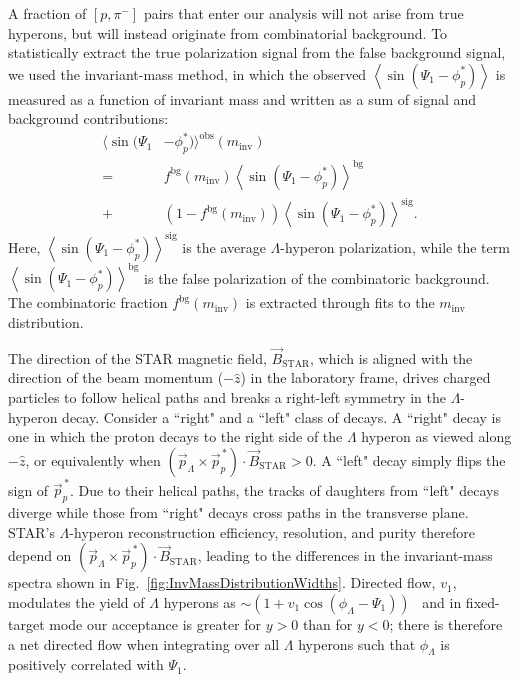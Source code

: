 \documentclass[
  reprint,
  superscriptaddress,
  amsmath,
  amssymb,
  aps,
  floatfix,
]{revtex4-2}
\newcommand{\proton}{p}
\newcommand{\pion}{\pi^{-}}
\newcommand{\InvMass}{m_\mathrm{inv}}
\newcommand{\pstar}{_\proton^{*}}
\newcommand{\PpStar}{\vec{p}_\proton^{\,*}} %
\newcommand{\PsiEP}{\Psi_{1}}
\newcommand{\sig}{^\mathrm{sig}}
\newcommand{\bg}{^\mathrm{bg}}
\newcommand{\obs}{^\mathrm{obs}}
\newcommand{\BSTAR}{\vec{B}_\mathrm{STAR}}
\newcommand{\PolarizationCorrelationTerm}{\left<\sin(\PsiEP-\phi\pstar)\right>}
\newcommand{\RightLeftTripleProduct}{\left(\vec{p}_\Lambda\times\PpStar\right)\cdot\BSTAR}
\begin{document}
A fraction of $[\proton,\pion]$ pairs that
 enter our analysis will not arise
 from true hyperons, but will instead
 originate from combinatorial background. To statistically
 extract the true polarization signal from
 the false background signal, we used
 the invariant-mass method\cite{Adam:2018ivw,Adamczyk:2013gw,Borghini:2004ra}, in which the
 observed $\left\langle\sin\left(\PsiEP-\phi\pstar\right)\right\rangle$ is measured as a
 function of invariant mass and written
 as a sum of signal and
 background contributions:
\begin{align}
\label{eq:InvMassMethod}
  \langle\sin(\PsiEP&-\phi\pstar)\rangle\obs\left(\InvMass\right)\\
  =&f\bg\left(\InvMass\right)\PolarizationCorrelationTerm\bg \nonumber \\
  +&\left(1-f\bg\left(\InvMass\right)\right)\PolarizationCorrelationTerm\sig. \nonumber
\end{align}
Here, $\PolarizationCorrelationTerm\sig$ is the average $\Lambda$-hyperon
 polarization, while the term $\PolarizationCorrelationTerm\bg$ is
 the false polarization of the combinatoric
 background. The combinatoric fraction $f\bg(\InvMass)$ is
 extracted through fits to the $\InvMass$
 distribution.

The direction of the STAR magnetic
 field, $\BSTAR$, which is aligned with
 the direction of the beam momentum
 ($-\hat{z}$) in the laboratory frame, drives
 charged particles to follow helical paths
 and breaks a right-left symmetry in
 the $\Lambda$-hyperon decay. Consider a ``right"
 and a ``left" class of decays.
 A ``right" decay is one in
 which the proton decays to the
 right side of the $\Lambda$ hyperon
 as viewed along $-\hat{z}$, or equivalently
 when $\RightLeftTripleProduct>0$. A ``left" decay simply
 flips the sign of $\PpStar$. Due
 to their helical paths, the tracks
 of daughters from ``left" decays diverge
 while those from ``right" decays cross
 paths in the transverse plane. STAR's
 $\Lambda$-hyperon reconstruction efficiency, resolution, and purity
 therefore depend on $\RightLeftTripleProduct$, leading to
 the differences in the invariant-mass spectra
 shown in Fig.~\ref{fig:InvMassDistributionWidths}. Directed flow, $v_1$,
 modulates the yield of $\Lambda$
 hyperons as $\sim\left(1+v_1\cos\left(\phi_\Lambda-\PsiEP\right)\right)$~\cite{Voloshin:2008dg} and in fixed-target
 mode our acceptance is greater for
 $y>0$ than for $y<0$; there is
 therefore a net directed flow 
 when integrating over all $\Lambda$ hyperons
 such that $\phi_\Lambda$ is positively correlated
 with $\PsiEP$. 
  
\end{document}
